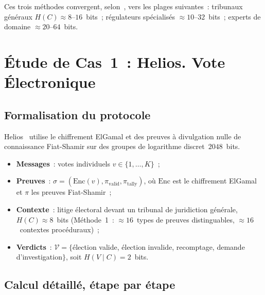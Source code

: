 Ces trois méthodes convergent, selon~\cite{minka2026clo}, vers les
plages suivantes~: tribunaux généraux $H(C) \approx 8$--$16$~bits~;
régulateurs spécialisés $\approx 10$--$32$~bits~; experts de
domaine $\approx 20$--$64$~bits.

\section{Étude de Cas~1~: Helios. Vote Électronique}
\label{sec:cas-helios}

\subsection{Formalisation du protocole}

Helios~\cite{adida2009helios} utilise le chiffrement ElGamal et des
preuves à divulgation nulle de connaissance Fiat-Shamir sur des
groupes de logarithme discret~$2048$~bits.

\begin{itemize}
    \item \textbf{Messages}~: votes individuels $v \in \{1,\ldots,K\}$~;
    \item \textbf{Preuves}~: $\sigma = (\mathrm{Enc}(v), \pi_{\mathrm{valid}},
          \pi_{\mathrm{tally}})$, où $\mathrm{Enc}$ est le
          chiffrement ElGamal et $\pi$ les preuves Fiat-Shamir~;
    \item \textbf{Contexte}~: litige électoral devant un tribunal de
          juridiction générale, $H(C) \approx 8$~bits (Méthode~1~:
          $\approx 16$~types de preuves distinguables, $\approx
          16$~contextes procéduraux)~;
    \item \textbf{Verdicts}~: $\mathcal{V} = \{$élection valide,
          élection invalide, recomptage, demande d'investigation$\}$,
          soit $H(V \mid C) = 2$~bits.
\end{itemize}

\subsection{Calcul détaillé, étape par étape}

